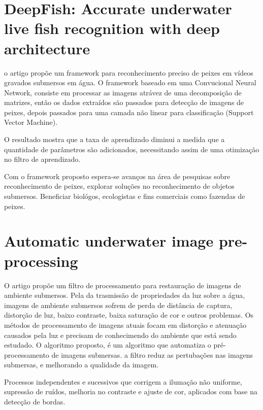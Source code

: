 \label{chap:trab_cor}

\section{DeepFish: Accurate underwater live fish recognition with deep architecture}
o artigo propõe um framework para reconhecimento preciso de peixes em vídeos gravados submersos em água. O framework baseado em uma Convucional Neural Network, consiste em processar as imagens atrávez de uma decomposição de matrizes, então os dados extraídos são passados para detecção de imagens de peixes, depois passados para uma camada não linear para classificação (Support Vector Machine). 

O resultado mostra que a taxa de aprendizado diminui a medida que a quantidade de parâmetros são adicionados, necessitando assim de uma otimização no filtro de aprendizado.

Com o framework proposto espera-se avanços na área de pesquisas sobre reconhecimento de peixes, explorar soluções no reconhecimento de objetos submersos. Beneficiar biológos, ecologistas e fins comerciais como fazendas de peixes.

\section{Automatic underwater image pre-processing}

O artigo propõe um filtro de processamento para restauração de imagens de ambiente submersos. Pela da trasmissão de propriedades da luz sobre a água, imagens de ambiente submersos sofrem de perda de distância de captura, distorção de luz, baixo contraste, baixa saturação de cor e outros problemas. Os métodos de processamento de imagens atuais focam em distorção e atenuação causados pela luz e precisam de conhecimendo do ambiente que está sendo estudado. O algoritmo proposto, é um algoritmo que automatiza o pré-processamento de imagens submersas.  a filtro reduz as pertubações nas imagens submersas, e melhorando a qualidade da imagem.

 Processos independentes e sucessivos que corrigem a ilumação não uniforme, supressão de ruídos, melhoria no contraste e ajuste de cor, aplicados com base na detecção de bordas.

